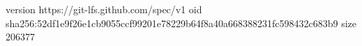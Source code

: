 version https://git-lfs.github.com/spec/v1
oid sha256:52df1e9f26e1cb9055ccf99201e78229b64f8a40a668388231fc598432c683b9
size 206377
